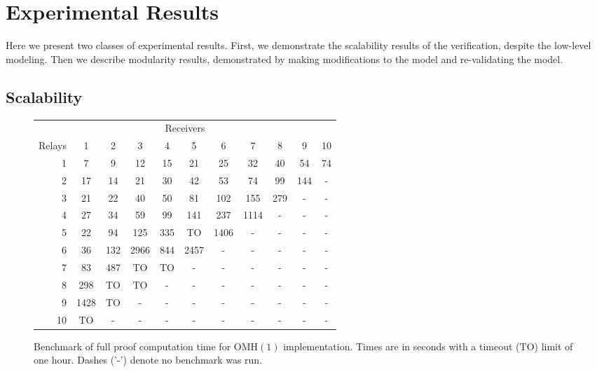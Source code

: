 \documentclass{llncs/llncs}
\newcommand{\OMH}{\ensuremath{\mathrm{OMH}}}
\begin{document}
\section{Experimental Results}\label{sec:experimental}

Here we present two classes of experimental results. First, we demonstrate the scalability results of the verification, despite the low-level modeling. Then we describe modularity results, demonstrated by making modifications to the model and re-validating the model.

\subsection{Scalability}

\begin{figure}
  \centering
  \begin{tabular}{r||c|c|c|c|c|c|c|c|c|c|}
      \multicolumn{11}{c}{Receivers} \\
      \cline{2-11}
   Relays &   1  &  2  &   3  &  4  &   5  &  6   &  7   &  8  &  9  &  10 \\
      \hline \hline
      1   & 7    & 9   & 12   & 15  & 21   & 25   & 32   & 40  & 54  & 74  \\
      \hline
      2   & 17   & 14  & 21   & 30  & 42   & 53   & 74   & 99  & 144 & -   \\
      \hline
      3   & 21   & 22  & 40   & 50  & 81   & 102  & 155  & 279 & -   & -   \\
      \hline
      4   & 27   & 34  & 59   & 99  & 141  & 237  & 1114 & -   & -   & -   \\
      \hline
      5   & 22   & 94  & 125  & 335 & TO   & 1406 & -    & -   & -   & -   \\
      \hline
      6   & 36   & 132 & 2966 & 844 & 2457 & -    & -    & -   & -   & -   \\
      \hline
      7   & 83   & 487 & TO   & TO  & -    & -    & -    & -   & -   & -   \\
      \hline
      8   & 298  & TO  & TO   & -   & -    & -    & -    & -   & -   & -   \\
      \hline
      9   & 1428 & TO  & -    & -   & -    & -    & -    & -   & -   & -   \\
      \hline
     10   & TO   & -   & -    & -   & -    & -    & -    & -   & -   & -   \\
      \hline
  \end{tabular}
  \label{fig:benchmark}
  \caption{Benchmark of full proof computation time for $\OMH(1)$ implementation. Times are in seconds with a timeout (TO) limit of one hour. Dashes ('-') denote no benchmark was run.}
\end{figure}
\end{document}
